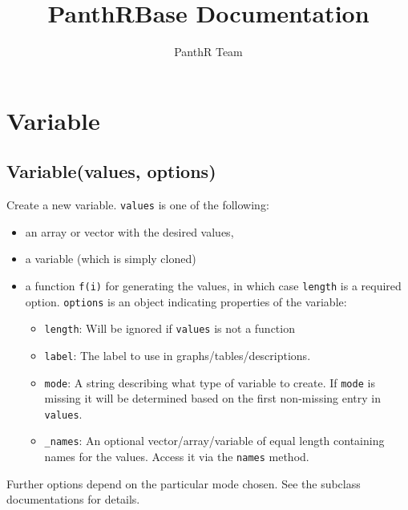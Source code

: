 \documentclass{article}
\title{PanthRBase Documentation}
\author{PanthR Team}
\begin{document}
\maketitle

\tableofcontents

  \section{Variable}
    \subsection{Variable(values, options)}
    Create a new variable. \texttt{values} is one of the following:


\begin{itemize}

\item an array or vector with the desired values,

\item a variable (which is simply cloned)

\item a function \texttt{f(i)} for generating the values, in which case \texttt{length} is
a required option.
\texttt{options} is an object indicating properties of the variable:\begin{itemize}

\item \texttt{length}: Will be ignored if \texttt{values} is not a function

\item \texttt{label}: The label to use in graphs/tables/descriptions.

\item \texttt{mode}: A string describing what type of variable to create. If \texttt{mode} is missing
it will be determined based on the first non-missing entry in \texttt{values}.

\item \texttt{\_names}: An optional vector/array/variable of equal length containing names for
the values. Access it via the \texttt{names} method.

\end{itemize}



\end{itemize}

Further options depend on the particular mode chosen. See the subclass documentations
for details.
\end{document}
